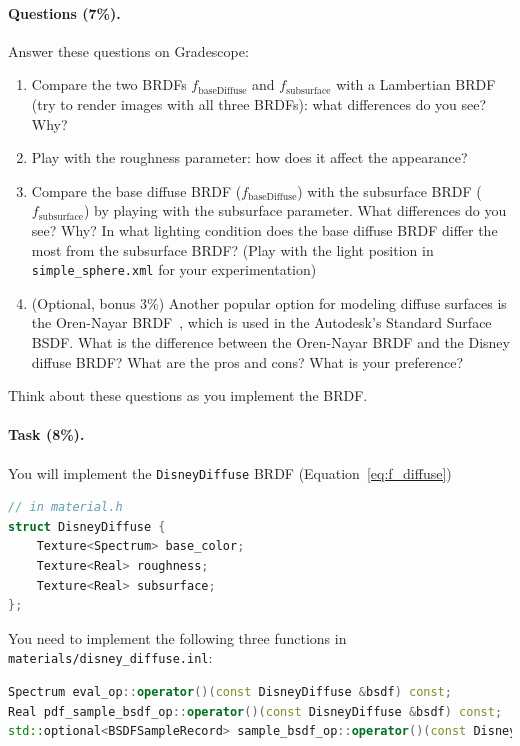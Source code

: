\paragraph{Questions (7\%).} 
Answer these questions on Gradescope:
\begin{enumerate}
    \item Compare the two BRDFs $f_{\text{baseDiffuse}}$ and $f_{\text{subsurface}}$ with a Lambertian BRDF (try to render images with all three BRDFs): what differences do you see? Why?
    \item Play with the roughness parameter: how does it affect the appearance? 
    \item Compare the base diffuse BRDF ($f_{\text{baseDiffuse}}$) with the subsurface BRDF ($f_{\text{subsurface}}$) by playing with the subsurface parameter. What differences do you see? Why? In what lighting condition does the base diffuse BRDF differ the most from the subsurface BRDF? (Play with the light position in \lstinline{simple_sphere.xml} for your experimentation)
    \item (Optional, bonus 3\%) Another popular option for modeling diffuse surfaces is the Oren-Nayar BRDF~\cite{Oren:1994:GLR}, which is used in the Autodesk's Standard Surface BSDF. What is the difference between the Oren-Nayar BRDF and the Disney diffuse BRDF? What are the pros and cons? What is your preference?
\end{enumerate}
Think about these questions as you implement the BRDF.

\paragraph{Task (8\%).} You will implement the \lstinline{DisneyDiffuse} BRDF (Equation~\ref{eq:f_diffuse})
\begin{lstlisting}[language=c++]
// in material.h
struct DisneyDiffuse {
    Texture<Spectrum> base_color;
    Texture<Real> roughness;
    Texture<Real> subsurface;
};
\end{lstlisting}

You need to implement the following three functions in \lstinline{materials/disney_diffuse.inl}:
\begin{lstlisting}[language=c++]
Spectrum eval_op::operator()(const DisneyDiffuse &bsdf) const;
Real pdf_sample_bsdf_op::operator()(const DisneyDiffuse &bsdf) const;
std::optional<BSDFSampleRecord> sample_bsdf_op::operator()(const DisneyDiffuse &bsdf) const;
\end{lstlisting}

